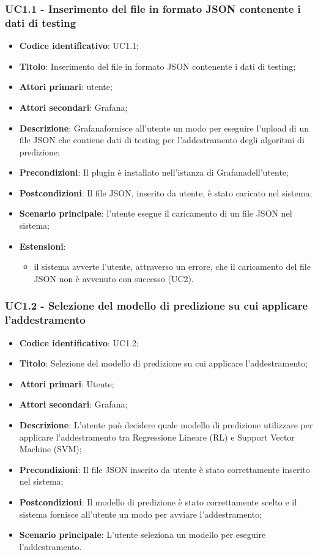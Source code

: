 	\subsubsection{UC1.1 - Inserimento del file in formato JSON contenente i dati di testing}
	\begin{itemize}
		\item \textbf{Codice identificativo}: UC1.1;
		\item \textbf{Titolo}: Inserimento del file in formato JSON contenente i dati di testing;
		\item \textbf{Attori primari}: utente;
		\item \textbf{Attori secondari}: Grafana\glo;
		\item \textbf{Descrizione}: Grafana\glosp fornisce all'utente un modo per eseguire l'upload di un file JSON che contiene dati di testing per l'addestramento degli algoritmi di predizione;
		\item \textbf{Precondizioni}: Il plugin è installato nell'istanza di Grafana\glosp dell'utente;
		\item \textbf{Postcondizioni}: Il file JSON, inserito da utente, è stato caricato nel sistema;
		\item \textbf{Scenario principale}: l'utente esegue il caricamento di un file JSON nel sistema;
		\item \textbf{Estensioni}:
			\begin{itemize}
				\item il sistema avverte l'utente, attraverso un errore, che il caricamento del file JSON non è avvenuto con successo (UC2).
			\end{itemize}
	
	\end{itemize}

	\subsubsection{UC1.2 - Selezione del modello di predizione su cui applicare l'addestramento}
	\begin{itemize}
		\item \textbf{Codice identificativo}: UC1.2;
		\item \textbf{Titolo}: Selezione del modello di predizione su cui applicare l'addestramento;
		\item \textbf{Attori primari}: Utente;
		\item \textbf{Attori secondari}: Grafana\glo;
		\item \textbf{Descrizione}: L'utente può decidere quale modello di predizione utilizzare per applicare l'addestramento tra Regressione Lineare (RL\glo) e Support Vector Machine (SVM\glo);
		\item \textbf{Precondizioni}: Il file JSON inserito da utente è stato correttamente inserito nel sistema;
		\item \textbf{Postcondizioni}: Il modello di predizione è stato correttamente scelto e il sistema fornisce all'utente un modo per avviare l'addestramento;
		\item \textbf{Scenario principale}: L'utente seleziona un modello per eseguire l'addestramento.
		
	\end{itemize}

